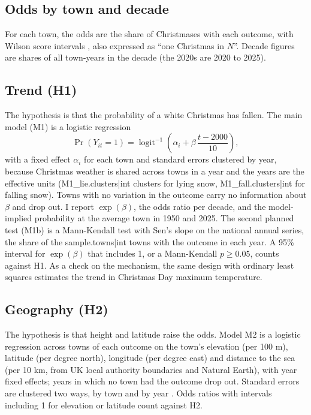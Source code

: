 \documentclass[11pt,a4paper]{article}
\begin{document}
\subsection{Odds by town and decade}
For each town, the odds are the share of Christmases with each outcome, with Wilson score intervals \citep{wilson1927}, also expressed as ``one Christmas in $N$''. Decade figures are shares of all town-years in the decade (the 2020s are 2020 to 2025).

\subsection{Trend (H1)}
The hypothesis is that the probability of a white Christmas has fallen. The main model (M1) is a logistic regression
\begin{equation}
\Pr(Y_{it}=1) = \operatorname{logit}^{-1}\left(\alpha_i + \beta\,\frac{t-2000}{10}\right),
\end{equation}
with a fixed effect $\alpha_i$ for each town and standard errors clustered by year, because Christmas weather is shared across towns in a year and the years are the effective units ({{M1_lie.clusters|int}} clusters for lying snow, {{M1_fall.clusters|int}} for falling snow). Towns with no variation in the outcome carry no information about $\beta$ and drop out. I report $\exp(\beta)$, the odds ratio per decade, and the model-implied probability at the average town in 1950 and 2025. The second planned test (M1b) is a Mann-Kendall test \citep{mann1945} with Sen's slope \citep{sen1968} on the national annual series, the share of the {{sample.towns|int}} towns with the outcome in each year. A 95\% interval for $\exp(\beta)$ that includes 1, or a Mann-Kendall $p \geq 0.05$, counts against H1. As a check on the mechanism, the same design with ordinary least squares estimates the trend in Christmas Day maximum temperature.

\subsection{Geography (H2)}
The hypothesis is that height and latitude raise the odds. Model M2 is a logistic regression across towns of each outcome on the town's elevation (per 100 m), latitude (per degree north), longitude (per degree east) and distance to the sea (per 10 km, from UK local authority boundaries and Natural Earth), with year fixed effects; years in which no town had the outcome drop out. Standard errors are clustered two ways, by town and by year \citep{cameron2011}. Odds ratios with intervals including 1 for elevation or latitude count against H2.
\end{document}
